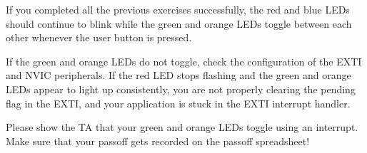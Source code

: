 \documentclass[openany,11pt,fleqn]{book} %
\newcommand{\code}[3]{
    \begin{figure}[]
        \colorbox{gray!20!white}{
            \parbox{\linewidth-2\fboxsep} {
                \centering 
                
            }
        }
        \caption{#2}
        \label{#3}
    \end{figure}
}
\begin{document}
\begin{exercise}
    \noindent If you completed all the previous exercises successfully, the red and blue LEDs should continue to blink while the green and orange LEDs toggle between each other whenever the user button is pressed. 
    
    If the green and orange LEDs do not toggle, check the configuration of the EXTI and NVIC peripherals. If the red LED stops flashing and the green and orange LEDs appear to light up consistently, you are not properly clearing the pending flag in the EXTI, and your application is stuck in the EXTI interrupt handler.
    
\end{exercise}

\begin{assignment}
	Please show the TA that your green and orange LEDs toggle using an interrupt. Make sure that your passoff gets recorded on the passoff spreadsheet!
\end{assignment}


%    
%    
%    
%    
\end{document}

